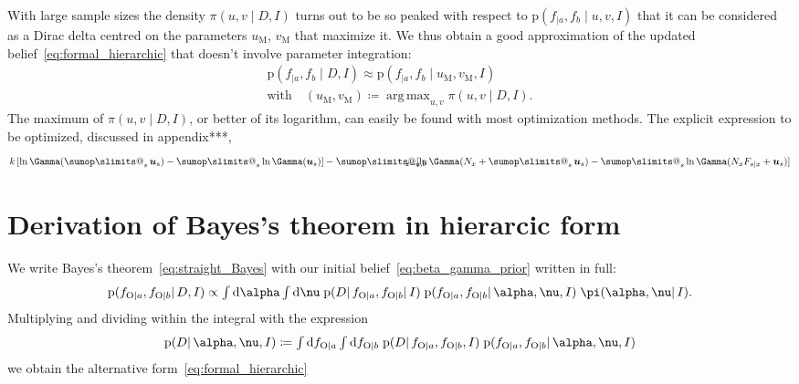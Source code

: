 \documentclass[\ifafour a4paper,12pt,\else a5paper,10pt,\fi%
onecolumn,oneside,article,%
british%
]{memoir}
\makeatletter
\theoremstyle{remark}
\theoremstyle{innote}
\def\sum{\DOTSI\sumop\slimits@}
\newcommand*{\di}{\mathrm{d}}%
\newcommand*{\defd}{\coloneqq}
\newcommand*{\pf}{\mathrm{p}}%
\renewcommand*{\|}{\mathpunct{|}}
\newcommand*{\tsum}{\mathop{\textstyle\sum}\nolimits}
\newcommand*{\tint}{\begingroup\textstyle\int\endgroup\nolimits}
\DeclareMathOperator*{\argmax}{arg\,max}
\newcommand*{\yD}{D}
\newcommand*{\yI}{I}
\newcommand*{\ya}{a}
\newcommand*{\yb}{b}
\newcommand*{\ysA}{\textrm{O}}%
\newcommand*{\dbeta}{\betaup}
\newcommand*{\dA}{\pi}
\newcommand*{\yA}{\alpha}
\newcommand*{\yqq}{\nu}
\newcommand*{\yq}{\bm{\yqq}}
\newcommand*{\yu}{\bm{u}}
\newcommand*{\yua}{u}
\newcommand*{\yub}{v}
\newcommand*{\yuam}{\yua_{\text{M}}}
\newcommand*{\yubm}{\yub_{\text{M}}}
\newcommand*{\yna}{k}
\makeatother
\begin{document}
With large sample sizes the density $\dA(\yua,\yub \|\yD, \yI)$ turns out to
be so peaked with respect to
$\pf(f_{|\ya}, f_{\yb}\| \yua,\yub,\yI)$ that it can be considered
as a Dirac delta centred on the parameters $\yuam$, $\yubm$ that maximize it.
We thus obtain a good approximation of the updated
belief~\eqref{eq:formal_hierarchic} that doesn't involve parameter integration:
\begin{multline}
  \label{eq:formal_hierarchic_approx}
  \pf(f_{|\ya}, f_{\yb} \| \yD, \yI) \approx
  \pf(f_{|\ya}, f_{\yb}\| \yuam,\yubm,\yI)\\
  \text{with}\quad
  (\yuam,\yubm) \defd \argmax_{\yua,\yub}\dA(\yua,\yub \|\yD, \yI).
\end{multline}
The maximum of $\dA(\yua,\yub \|\yD, \yI)$, or better of its logarithm, can
easily be found with most optimization methods. The explicit expression to
be optimized, discussed in appendix***,
\begin{equation}
  \label{eq:to_optimize}
  \yna\,[\ln\Gamma(\tsum_s\yu_s) - \tsum_s\ln\Gamma(\yu_s)]
  -\sum_{\mathclap{x=\ya,\yb}}
  [\ln\Gamma(N_x+\tsum_s\yu_s) - \tsum_s\ln\Gamma(N_xF_{s\|x}+\yu_s)]
\end{equation}


\section{Derivation of Bayes's theorem in hierarcic form}
\label{sec:bayes_hierarcic}

We write Bayes's theorem~\eqref{eq:straight_Bayes} with our initial
belief~\eqref{eq:beta_gamma_prior} written in full:
\begin{equation}
  \label{eq:straight_Bayes_full_prior}
  \pf(f_{\ysA\|\ya}, f_{\ysA\|\yb} \| \yD, \yI)
  \propto
  \tint\di\yA\tint\di\yq\;
    \pf(\yD \| f_{\ysA\|\ya}, f_{\ysA\|\yb} \| \yI)\;
 \pf(f_{\ysA\|\ya}, f_{\ysA\|\yb} \|\yA,\yq, \yI)\;
  \dA(\yA,\yq \|\yI).
\end{equation}
Multiplying and dividing within the integral with the expression
\begin{equation}
  \label{eq:def_Aq_given_data}
    \pf(\yD \|\yA,\yq,\yI)\defd
\tint\di f_{\ysA\|\ya}\tint\di f_{\ysA\|\yb}\;
  \pf(\yD \|f_{\ysA\|\ya}, f_{\ysA\|\yb}, \yI)\;
  \pf(f_{\ysA\|\ya}, f_{\ysA\|\yb}\| \yA,\yq,\yI)
\end{equation}
we obtain the alternative form~\eqref{eq:formal_hierarchic}
\end{document}
